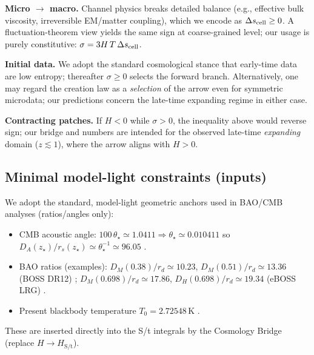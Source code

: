\medskip
\noindent\textbf{Micro $\to$ macro.}
Channel physics breaks detailed balance (e.g., effective bulk viscosity, irreversible EM/matter coupling), which we encode as $\Delta s_{\rm cell}\ge 0$. A fluctuation-theorem view yields the same sign at coarse-grained level; our usage is purely constitutive: $\sigma=3H\,T\,\Delta s_{\rm cell}$.

\medskip
\noindent\textbf{Initial data.}
We adopt the standard cosmological stance that early-time data are low entropy; thereafter $\sigma\ge 0$ selects the forward branch. Alternatively, one may regard the creation law as a \emph{selection} of the arrow even for symmetric microdata; our predictions concern the late-time expanding regime in either case.

\medskip
\noindent\textbf{Contracting patches.}
If $H<0$ while $\sigma>0$, the inequality above would reverse sign; our bridge and numbers are intended for the observed late-time \emph{expanding} domain ($z\lesssim 1$), where the arrow aligns with $H>0$.

\subsection{Minimal model-light constraints (inputs)}
We adopt the standard, model-light geometric anchors used in BAO/CMB analyses (ratios/angles only):
\begin{itemize}
  \item CMB acoustic angle: $100\,\theta_\star \simeq 1.0411 \Rightarrow \theta_\star\simeq 0.010411$ so $D_A(z_\star)/r_s(z_\star)\simeq \theta_\star^{-1}\simeq 96.05$ \cite{planck2018params}.
  \item BAO ratios (examples): $D_M(0.38)/r_d\simeq 10.23$, $D_M(0.51)/r_d\simeq 13.36$ (BOSS DR12) \cite{alam2017bossdr12};
        $D_M(0.698)/r_d\simeq 17.86$, $D_H(0.698)/r_d\simeq 19.34$ (eBOSS LRG) \cite{bautista2021ebosslrg}.
  \item Present blackbody temperature $T_0=2.72548\,$K \cite{fixsen2009}.
\end{itemize}
These are inserted directly into the S/t integrals by the Cosmology Bridge (replace $H\to H_{\text{S/t}}$).


